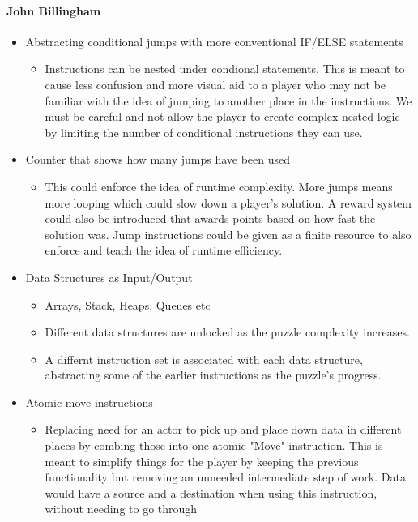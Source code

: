 \paragraph{John Billingham}
\begin{itemize}
  \item Abstracting conditional jumps with more conventional IF/ELSE statements
  \begin{itemize}
    \item Instructions can be nested under condional statements. This is meant to
    cause less confusion and more visual aid to a player who may not be familiar
    with the idea of jumping to another place in the instructions. We must be careful
    and not allow the player to create complex nested logic by limiting the number
    of conditional instructions they can use.
  \end{itemize}
  \item Counter that shows how many jumps have been used
  \begin{itemize}
    \item This could enforce the idea of runtime complexity. More jumps means more
    looping which could slow down a player's solution. A reward system could also
    be introduced that awards points based on how fast the solution was. Jump
    instructions could be given as a finite resource to also enforce and teach the
    idea of runtime efficiency.
  \end{itemize}
  \item Data Structures as Input/Output
  \begin{itemize}
    \item Arrays, Stack, Heaps, Queues etc
    \item Different data structures are unlocked as the puzzle complexity increases.
    \item A differnt instruction set is associated with each data structure, abstracting
    some of the earlier instructions as the puzzle's progress.
  \end{itemize}
  \item Atomic move instructions
  \begin{itemize}
    \item Replacing need for an actor to pick up and place down data  in different places by combing those into
    one atomic "Move" instruction. This is meant to simplify things for the player by keeping
    the previous functionality but removing an unneeded intermediate step of work. Data would have
    a source and a destination when using this instruction, without needing to go through

\end{itemize}
\end{itemize}
